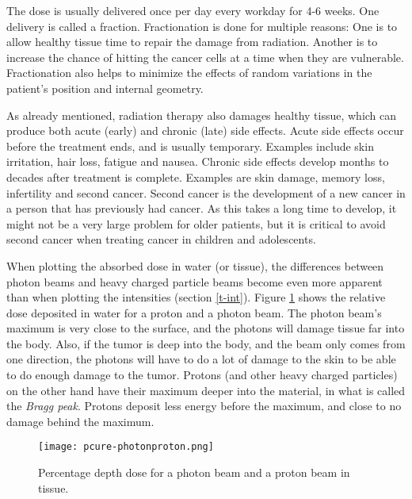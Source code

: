 \documentclass[../main/thesis.tex]{subfiles}
\begin{document}
The dose is usually delivered once per day every workday for 4-6 weeks. One delivery is called a fraction. Fractionation is done for multiple reasons: One is to allow healthy tissue time to repair the damage from radiation. Another is to increase the chance of hitting the cancer cells at a time when they are vulnerable. Fractionation also helps to minimize the effects of random variations in the patient's position and internal geometry. \citep{fractionation} \citep{hysing-uncertain}

As already mentioned, radiation therapy also damages healthy tissue, which can produce both acute (early) and chronic (late) side effects. Acute side effects occur before the treatment ends, and is usually temporary. Examples include skin irritation, hair loss, fatigue and nausea. Chronic side effects develop months to decades after treatment is complete. Examples are skin damage, memory loss, infertility and second cancer. Second cancer is the development of a new cancer in a person that has previously had cancer. As this takes a long time to develop, it might not be a very large problem for older patients, but it is critical to avoid second cancer when treating cancer in children and adolescents. \citep{nih} 

When plotting the absorbed dose in water (or tissue), the differences between photon beams and heavy charged particle beams become even more apparent than when plotting the intensities (section \ref{t-int}). Figure \ref{fig-photonproton} shows the relative dose deposited in water for a proton and a photon beam. The photon beam's maximum is very close to the surface, and the photons will damage tissue far into the body. Also, if the tumor is deep into the body, and the beam only comes from one direction, the photons will have to do a lot of damage to the skin to be able to do enough damage to the tumor. Protons (and other heavy charged particles) on the other hand have their maximum deeper into the material, in what is called the \textit{Bragg peak}. Protons deposit less energy before the maximum, and close to no damage behind the maximum. 

\begin{figure}%
	\centering
	\texttt{[image: pcure-photonproton.png]}
	\caption{Percentage depth dose for a photon beam and a proton beam in tissue. \citetext{\citeauthor{pcure}}}
	\label{fig-photonproton}
\end{figure}
\end{document}
